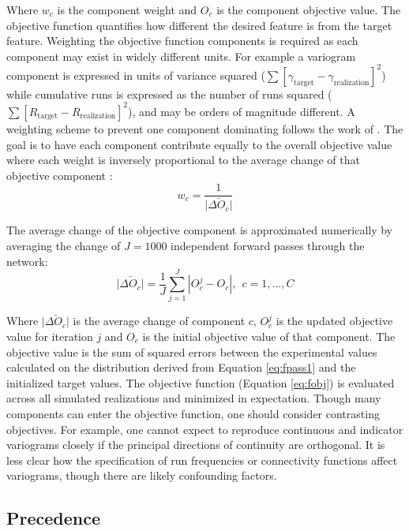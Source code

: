 Where $w_{c}$ is the component weight and $O_{c}$ is the component objective value. The objective function quantifies how different the desired feature is from the target feature. Weighting the objective function components is required as each component may exist in widely different units. For example a variogram component is expressed in units of variance squared ($\sum [ \gamma_{\text{target}} - \gamma_{\text{realization}}]^{2}$) while cumulative runs is expressed as the number of runs squared ($\sum [ R_{\text{target}} - R_{\text{realization}}]^{2}$), and may be orders of magnitude different. A weighting scheme to prevent one component dominating follows the work of \cite{deutsch1992annealing}. The goal is to have each component contribute equally to the overall objective value where each weight is inversely proportional to the average change of that objective component \citep{deutsch1992annealing}:
\begin{equation}
    w_{c} = \frac{1}{\bar{|\Delta O_{c}|}}
    \label{eq:fobj_wt}
\end{equation}

The average change of the objective component is approximated numerically by averaging the change of $J=1000$ independent forward passes through the network:
\begin{equation}
    \bar{|\Delta O_{c}|} = \frac{1}{J} \sum_{j=1}^{J} | O^{j}_{c} - O_{c}|, \ \ c=1,\dots, C
    \label{eq:fobj_avg}
\end{equation}

Where $\bar{|\Delta O_{c}|}$ is the average change of component $c$, $O^{j}_{c}$ is the updated objective value for iteration $j$ and $O_{c}$ is the initial objective value of that component. The objective value is the sum of squared errors between the experimental values calculated on the distribution derived from Equation \ref{eq:fpass1} and the initialized target values. The objective function (Equation \ref{eq:fobj}) is evaluated across all simulated realizations and minimized in expectation. Though many components can enter the objective function, one should consider contrasting objectives. For example, one cannot expect to reproduce continuous and indicator variograms closely if the principal directions of continuity are orthogonal. It is less clear how the specification of run frequencies or connectivity functions affect variograms, though there are likely confounding factors.

\subsection{Precedence}
\label{subsec:04precedence}

